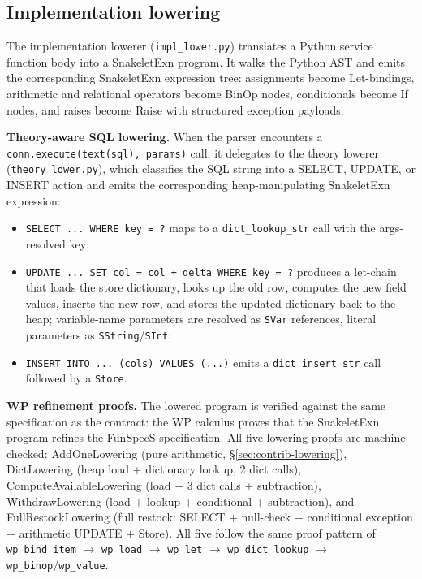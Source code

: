 \documentclass[11pt,a4paper]{article}
\begin{document}
\subsection{Implementation lowering}
\label{sec:impl-lowering}

The implementation lowerer (\texttt{impl\_lower.py}) translates a
Python service function body into a SnakeletExn program.  It walks
the Python AST and emits the corresponding SnakeletExn expression
tree: assignments become Let-bindings, arithmetic and relational
operators become BinOp nodes, conditionals become If nodes, and
raises become Raise with structured exception payloads.

\textbf{Theory-aware SQL lowering.}  When the parser encounters a
\texttt{conn.execute(text(sql), params)} call, it delegates to the
theory lowerer (\texttt{theory\_lower.py}), which classifies the SQL
string into a SELECT, UPDATE, or INSERT action and emits the
corresponding heap-manipulating SnakeletExn expression:

\begin{itemize}[nosep]
\item \texttt{SELECT ... WHERE key = ?} maps to a
  \texttt{dict\_lookup\_str} call with the args-resolved key;
\item \texttt{UPDATE ... SET col = col + delta WHERE key = ?} produces
  a let-chain that loads the store dictionary, looks up the old row,
  computes the new field values, inserts the new row, and stores the
  updated dictionary back to the heap; variable-name parameters are
  resolved as \texttt{SVar} references, literal parameters as
  \texttt{SString}/\texttt{SInt};
\item \texttt{INSERT INTO ... (cols) VALUES (...)} emits a
  \texttt{dict\_insert\_str} call followed by a \texttt{Store}.
\end{itemize}

\textbf{WP refinement proofs.}  The lowered program is verified
against the same specification as the contract: the WP calculus proves
that the SnakeletExn program refines the FunSpecS specification.
All five lowering proofs are machine-checked:
\textsf{AddOneLowering} (pure arithmetic, \S\ref{sec:contrib-lowering}),
\textsf{DictLowering} (heap load + dictionary lookup, 2 dict calls),
\textsf{ComputeAvailableLowering} (load + 3 dict calls + subtraction),
\textsf{WithdrawLowering} (load + lookup + conditional + subtraction),
and \textsf{FullRestockLowering} (full restock: SELECT + null-check +
conditional exception + arithmetic UPDATE + Store).  All five follow the
same proof pattern of
\texttt{wp\_bind\_item} $\to$ \texttt{wp\_load} $\to$
\texttt{wp\_let} $\to$ \texttt{wp\_dict\_lookup} $\to$ \texttt{wp\_binop}/\texttt{wp\_value}.
\end{document}
